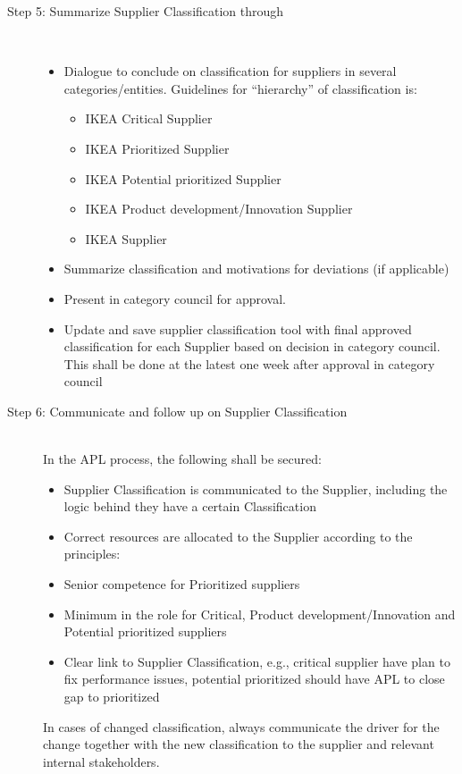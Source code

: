 \documentclass[oneside,12pt]{article}%
\begin{document}
\begin{description}
  \item[Step 5: Summarize Supplier Classification through] \hfill \\
  \begin{itemize}
    \item Dialogue to conclude on classification for suppliers in several categories/entities. Guidelines for “hierarchy” of classification is:
      \begin{itemize}
      \item IKEA Critical Supplier
      \item IKEA Prioritized Supplier
      \item IKEA Potential prioritized Supplier
      \item IKEA Product development/Innovation Supplier
      \item IKEA Supplier
      \end{itemize}
    \item Summarize classification and motivations for deviations (if applicable)
    \item Present in category council for approval.
    \item Update and save supplier classification tool with final approved classification for each Supplier based on decision in category council. This shall be done at the latest one week after approval in category council

  \end{itemize}
  \item[Step 6: Communicate and follow up on Supplier Classification ] \hfill \\
  In the APL process, the following shall be secured:
  \begin{itemize}
    \item Supplier Classification is communicated to the Supplier, including the logic behind they have a certain Classification
    \item Correct resources are allocated to the Supplier according to the principles:
    \item Senior competence for Prioritized suppliers
    \item Minimum in the role for Critical, Product development/Innovation and Potential prioritized suppliers
    \item Clear link to Supplier Classification, e.g., critical supplier have plan to fix performance issues, potential prioritized should have APL to close gap to prioritized
  \end{itemize}
  In cases of changed classification, always communicate the driver for the change together with the new classification to the supplier and relevant internal stakeholders.

\end{description}
\end{document}
